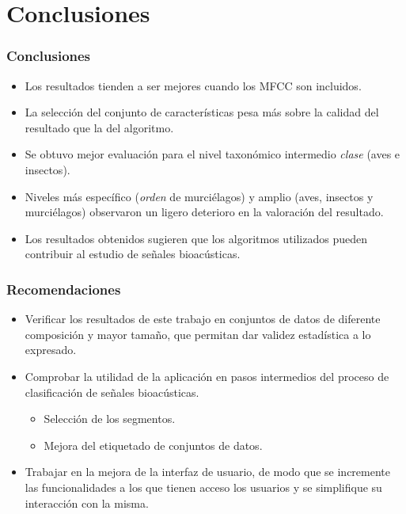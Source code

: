 \section*{Conclusiones}\label{sec:conclusion}

\begin{frame}
    \frametitle{Conclusiones}

    \begin{itemize}
        \item<2-> Los resultados tienden a ser mejores cuando los MFCC son incluidos.
        \item<3-> La selección del conjunto de características pesa más sobre la calidad del resultado que la del algoritmo.
        \item<4-> Se obtuvo mejor evaluación para el nivel taxonómico intermedio \textit{clase} (aves e insectos).
        \item<5-> Niveles más específico (\textit{orden} de murciélagos) y amplio (aves, insectos y murciélagos) observaron un ligero deterioro en la valoración del resultado.
    \end{itemize}

    \begin{itemize}
        \item<6-> Los resultados obtenidos sugieren que los algoritmos utilizados pueden contribuir al estudio de señales bioacústicas.
    \end{itemize}

\end{frame}

\begin{frame}
    \frametitle{Recomendaciones}

    \begin{itemize}
        \item<2-> Verificar los resultados de este trabajo en conjuntos de datos de diferente composición y mayor tamaño, que permitan dar validez estadística a lo expresado.
        \item<3-> Comprobar la utilidad de la aplicación en pasos intermedios del proceso de clasificación de señales bioacústicas.
        \begin{itemize}
            \item<4-> Selección de los segmentos.
            \item<5-> Mejora del etiquetado de conjuntos de datos.
        \end{itemize}
        \item<6-> Trabajar en la mejora de la interfaz de usuario, de modo que se incremente las funcionalidades a los que tienen acceso los usuarios y se simplifique su interacción con la misma.
    \end{itemize}

\end{frame}